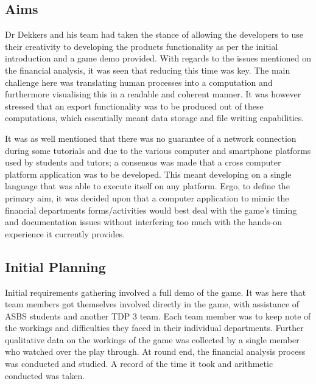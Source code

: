 \documentclass{l3proj}
\begin{document}
\subsection{Aims}
Dr Dekkers and his team had taken the stance of allowing the developers to use their creativity to developing the products functionality as per the initial introduction and a game demo provided. With regards to the issues mentioned on the financial analysis, it was seen that reducing this time was key. The main challenge here was translating human processes into a computation and furthermore visualising this in a readable and coherent manner. It was however stressed that an export functionality was to be produced out of these computations, which essentially meant data storage and file writing capabilities.
    
It was as well mentioned that there was no guarantee of a network connection during some tutorials and due to the various computer and smartphone platforms used by students and tutors; a consensus was made that a cross computer platform application was to be developed. This meant developing on a single language that was able to execute itself on any platform.
Ergo, to define the primary aim, it was decided upon that a computer application to mimic the financial departments forms/activities would best deal with the game's timing and documentation issues without interfering too much with the hands-on experience it currently provides.


\subsection{Initial Planning}
Initial requirements gathering involved a full demo of the game. It was here that team members got themselves involved directly in the game, with assistance of ASBS students and another TDP 3 team. Each team member was to keep note of the workings and difficulties they faced in their individual departments. Further qualitative data on the workings of the game was collected by a single member who watched over the play through. At round end, the financial analysis process was conducted and studied. A record of the time it took and arithmetic conducted was taken.
\end{document}
